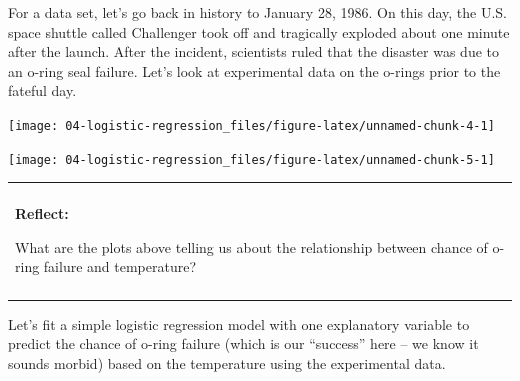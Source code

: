 \documentclass[
]{book}
\newenvironment{Shaded}{\begin{snugshade}}{\end{snugshade}}
\newcommand{\DataTypeTok}[1]{\textcolor[rgb]{0.13,0.29,0.53}{#1}}
\newcommand{\DecValTok}[1]{\textcolor[rgb]{0.00,0.00,0.81}{#1}}
\newcommand{\KeywordTok}[1]{\textcolor[rgb]{0.13,0.29,0.53}{\textbf{#1}}}
\newcommand{\NormalTok}[1]{#1}
\newcommand{\OperatorTok}[1]{\textcolor[rgb]{0.81,0.36,0.00}{\textbf{#1}}}
\newcommand{\StringTok}[1]{\textcolor[rgb]{0.31,0.60,0.02}{#1}}
\newenvironment{reflect}
{
    \begin{center}
    
    \begin{tabular}{|p{0.8\textwidth}|}
    \rowcolor{LightBlue}
    \hline\\
    \rowcolor{LightBlue}
    \textbf{Reflect:}
}
{
    \\\rowcolor{LightBlue}
    \\\hline
    \end{tabular} 
    \end{center}
}
\begin{document}
For a data set, let's go back in history to January 28, 1986. On this day, the U.S. space shuttle called Challenger took off and tragically exploded about one minute after the launch. After the incident, scientists ruled that the disaster was due to an o-ring seal failure. Let's look at experimental data on the o-rings prior to the fateful day.

\begin{Shaded}
\end{Shaded}

\begin{center}\texttt{[image: 04-logistic-regression\_files/figure-latex/unnamed-chunk-4-1]} \end{center}

\begin{center}\texttt{[image: 04-logistic-regression\_files/figure-latex/unnamed-chunk-5-1]} \end{center}

\begin{reflect}
What are the plots above telling us about the relationship between
chance of o-ring failure and temperature?
\end{reflect}

Let's fit a simple logistic regression model with one explanatory variable to predict the chance of o-ring failure (which is our ``success'' here -- we know it sounds morbid) based on the temperature using the experimental data.

\begin{Shaded}
\end{Shaded}
\end{document}
